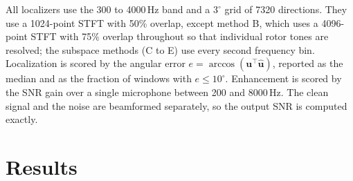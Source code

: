\documentclass{svproc}
\begin{document}
All localizers use the 300 to 4000\,Hz band and a $3^\circ$ grid of 7320 directions. They use a 1024-point STFT with 50\% overlap, except method B, which uses a 4096-point STFT with 75\% overlap throughout so that individual rotor tones are resolved; the subspace methods (C to E) use every second frequency bin.
Localization is scored by the angular error $e=\arccos(\mathbf{u}^{\top}\hat{\mathbf{u}})$, reported as the median and as the fraction of windows with $e\le10^\circ$.
Enhancement is scored by the SNR gain over a single microphone between 200 and 8000\,Hz.
The clean signal and the noise are beamformed separately, so the output SNR is computed exactly.
\section{Results}\label{sec:results}
\end{document}
